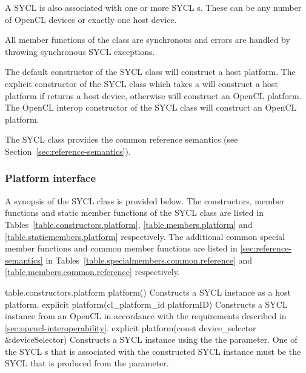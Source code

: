 A SYCL  is also associated with one or more SYCL s. These can be any number of OpenCL devices or exactly one host device.

All member functions of the  class are synchronous and errors are handled by throwing synchronous SYCL exceptions.

The default constructor of the SYCL  class will construct
a host platform. The explicit constructor of the SYCL 
class which takes a  will construct a host platform
if  returns a host device, otherwise will construct
an OpenCL platform. The OpenCL interop constructor of the SYCL
 class will construct an OpenCL platform.

The SYCL  class provides the common reference semantics
(see Section~\ref{sec:reference-semantics}).

\subsubsection{Platform interface}

A synopsis of the SYCL  class is provided below. The constructors, member functions and static member functions of the SYCL  class are listed in Tables~\ref{table.constructors.platform}, \ref{table.members.platform} and \ref{table.staticmembers.platform} respectively. The additional common special member functions and common member functions are listed in \ref{sec:reference-semantics} in Tables~\ref{table.specialmembers.common.reference} and \ref{table.members.common.reference} respectively.



{table.constructors.platform}
  \addRow
    {platform()}
    {
      Constructs a SYCL  instance as a host platform.
    }
  \addRow
    {explicit platform(cl_platform_id platformID)}
    {    
     Constructs a SYCL  instance from an OpenCL  in accordance with the requirements described in \ref{sec:opencl-interoperability}.
    }
  \addRow
    {explicit platform(const device_selector \&deviceSelector)}
    {
      Constructs a SYCL  instance using the the  parameter. One of the SYCL s that is associated with the constructed SYCL  instance must be the SYCL  that is produced from the  parameter.
    }
\completeTable

